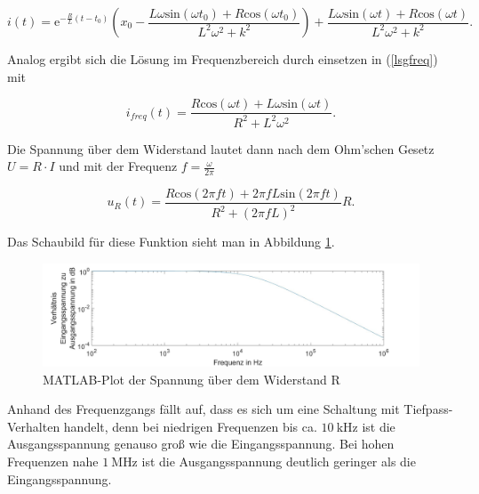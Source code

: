 \begin{equation*}
	i(t) = \mathrm{e}^{-\frac{R}{L}(t-t_0)}\left(x_0-\frac{L\omega \mathrm{sin}(\omega t_0)+R\mathrm{cos}(\omega t_0)}{L^2\omega^2+k^2}\right)+\frac{L\omega \mathrm{sin}(\omega t)+R\mathrm{cos}(\omega t)}{L^2\omega^2+k^2}.
\end{equation*}

Analog ergibt sich die Lösung im Frequenzbereich durch einsetzen in (\ref{lsgfreq}) mit

\begin{equation*}
	i_{freq} (t) = \frac{R\mathrm{cos}(\omega t) + L\omega\mathrm{sin}(\omega t)}{R^2+ L^2\omega^2}.
\end{equation*}

Die Spannung über dem Widerstand lautet dann nach dem Ohm'schen Gesetz $U=R\cdot I$ und mit der Frequenz $f=\frac{\omega}{2\pi}$

\begin{equation*}
u_{R} (t) = \frac{R\mathrm{cos}(2\pi ft) + 2\pi fL\mathrm{sin}(2\pi ft)}{R^2+ (2\pi fL)^2}R.
\end{equation*}

Das Schaubild für diese Funktion sieht man in Abbildung \ref{spannungplot}.

\begin{figure}[h]
	\includegraphics[width=\textwidth]{data/nocheinversuch.jpg}
	\caption{MATLAB-Plot der Spannung über dem Widerstand R}
	\label{spannungplot}
\end{figure}

Anhand des Frequenzgangs fällt auf, dass es sich um eine Schaltung mit Tiefpass-Verhalten handelt, denn bei niedrigen Frequenzen bis ca. $\SI{10}{\kilo\hertz}$ ist die Ausgangsspannung genauso groß wie die Eingangsspannung. Bei hohen Frequenzen nahe $\SI{1}{\mega \hertz}$ ist die Ausgangsspannung deutlich geringer als die Eingangsspannung.


